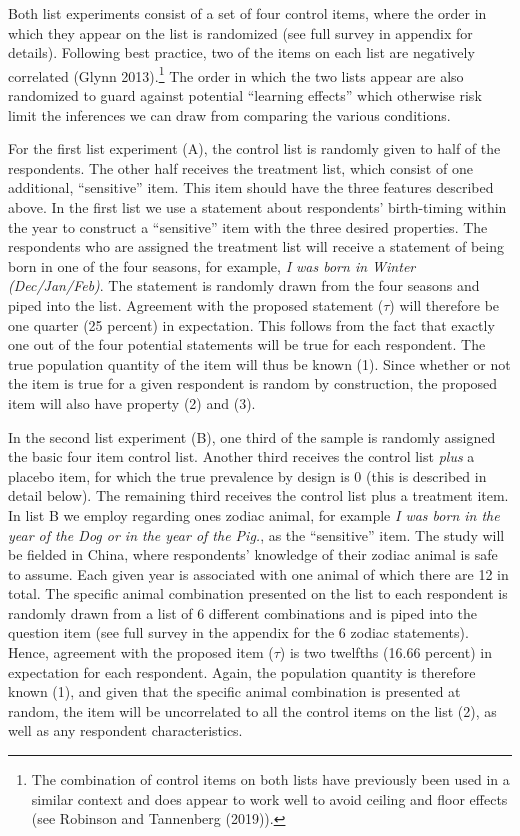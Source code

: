 \documentclass[]{article}
\let\rmarkdownfootnote\footnote%
\def\footnote{\protect\rmarkdownfootnote}
\begin{document}
Both list experiments consist of a set of four control items, where the
order in which they appear on the list is randomized (see full survey in
appendix for details). Following best practice, two of the items on each
list are negatively correlated (Glynn 2013).\footnote{The combination of
  control items on both lists have previously been used in a similar
  context and does appear to work well to avoid ceiling and floor
  effects (see Robinson and Tannenberg (2019)).} The order in which the
two lists appear are also randomized to guard against potential
``learning effects'' which otherwise risk limit the inferences we can
draw from comparing the various conditions.

For the first list experiment (A), the control list is randomly given to
half of the respondents. The other half receives the treatment list,
which consist of one additional, ``sensitive'' item. This item should
have the three features described above. In the first list we use a
statement about respondents' birth-timing within the year to construct a
``sensitive'' item with the three desired properties. The respondents
who are assigned the treatment list will receive a statement of being
born in one of the four seasons, for example, \emph{I was born in Winter
(Dec/Jan/Feb)}. The statement is randomly drawn from the four seasons
and piped into the list. Agreement with the proposed statement
(\(\tau\)) will therefore be one quarter (25 percent) in expectation.
This follows from the fact that exactly one out of the four potential
statements will be true for each respondent. The true population
quantity of the item will thus be known (1). Since whether or not the
item is true for a given respondent is random by construction, the
proposed item will also have property (2) and (3).

In the second list experiment (B), one third of the sample is randomly
assigned the basic four item control list. Another third receives the
control list \emph{plus} a placebo item, for which the true prevalence
by design is 0 (this is described in detail below). The remaining third
receives the control list plus a treatment item. In list B we employ
regarding ones zodiac animal, for example \emph{I was born in the year
of the Dog or in the year of the Pig.}, as the ``sensitive'' item. The
study will be fielded in China, where respondents' knowledge of their
zodiac animal is safe to assume. Each given year is associated with one
animal of which there are 12 in total. The specific animal combination
presented on the list to each respondent is randomly drawn from a list
of 6 different combinations and is piped into the question item (see
full survey in the appendix for the 6 zodiac statements). Hence,
agreement with the proposed item (\(\tau\)) is two twelfths (16.66
percent) in expectation for each respondent. Again, the population
quantity is therefore known (1), and given that the specific animal
combination is presented at random, the item will be uncorrelated to all
the control items on the list (2), as well as any respondent
characteristics.
\end{document}
